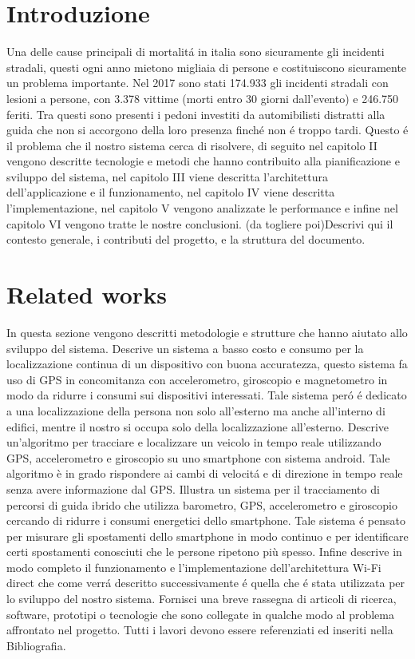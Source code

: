 \documentclass[conference]{IEEEtran}
\begin{document}
\section{Introduzione}
Una delle cause principali di mortalit\'a in italia sono sicuramente gli incidenti stradali, questi ogni anno mietono migliaia di persone e costituiscono sicuramente un problema importante. Nel 2017 sono stati 174.933 gli incidenti stradali con lesioni a persone, con 3.378 vittime (morti entro 30 giorni dall'evento) e 246.750 feriti. Tra questi sono presenti i pedoni investiti da automibilisti distratti alla guida che non si accorgono della loro presenza finch\'e non \'e troppo tardi. Questo \'e il problema che il nostro sistema cerca di risolvere, di seguito nel capitolo II vengono descritte tecnologie e metodi che hanno contribuito alla pianificazione e sviluppo del sistema, nel capitolo III viene descritta l'architettura dell'applicazione e il funzionamento, nel capitolo IV viene descritta l'implementazione, nel capitolo V vengono analizzate le performance e infine nel capitolo VI vengono tratte le nostre conclusioni.  
(da togliere poi)Descrivi qui il contesto generale, i contributi del progetto, e la struttura del documento.
 

\section{Related works}
In questa sezione vengono descritti metodologie e strutture che hanno aiutato allo sviluppo del sistema. \cite{ref1}  Descrive un sistema a basso costo e consumo per la localizzazione continua di un dispositivo con buona accuratezza, questo sistema fa uso di GPS in concomitanza con accelerometro, giroscopio e magnetometro in modo da ridurre i consumi sui dispositivi interessati. Tale sistema per\'o \'e dedicato a una localizzazione della persona non solo all'esterno ma anche all'interno di edifici, mentre il nostro si occupa solo della localizzazione all'esterno. \cite{ref2} Descrive un'algoritmo per tracciare e localizzare un veicolo in tempo reale utilizzando GPS, accelerometro e giroscopio su uno smartphone con sistema android. Tale algoritmo è in grado rispondere ai cambi di velocit\'a e di direzione in tempo reale senza avere informazione dal GPS. \cite{ref3} Illustra un sistema per il tracciamento di percorsi di guida ibrido che utilizza barometro, GPS, accelerometro e giroscopio cercando di ridurre i consumi energetici dello smartphone. Tale sistema \'e pensato per misurare gli spostamenti dello smartphone in modo continuo e per identificare certi spostamenti conosciuti che le persone ripetono più spesso. Infine \cite{ref4} descrive in modo completo il funzionamento e l'implementazione dell'architettura Wi-Fi direct che come verr\'a descritto successivamente \'e quella che \'e stata utilizzata per lo sviluppo del nostro sistema. 
Fornisci una breve rassegna di articoli di ricerca, software, prototipi o tecnologie che sono collegate in qualche modo al problema affrontato nel progetto. Tutti i lavori devono essere referenziati ed inseriti nella Bibliografia.
\end{document}
